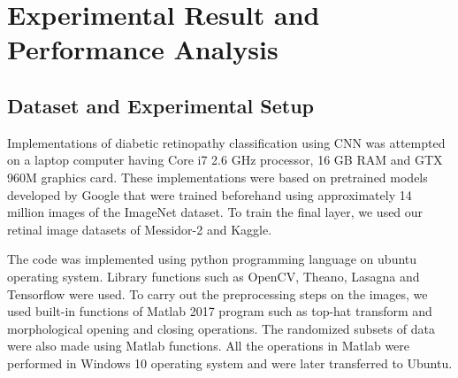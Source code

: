 \documentclass[12pt]{report}
\begin{document}
\chapter{Experimental Result and Performance Analysis}
\section{Dataset and Experimental Setup}
Implementations of diabetic retinopathy classification using CNN was attempted on a laptop computer having Core i7 2.6 GHz processor, 16 GB RAM and GTX 960M graphics card. These implementations were based on pretrained models developed by Google that were trained beforehand using approximately 14 million images of the ImageNet dataset. To train the final layer, we used our retinal image datasets of Messidor-2 and Kaggle. 

\noindent The code was implemented using python programming language on ubuntu operating system. Library functions such as OpenCV, Theano, Lasagna and Tensorflow were used. To carry out the preprocessing steps on the images, we used built-in functions of Matlab 2017 program such as top-hat transform and morphological opening and closing operations. The randomized subsets of data were also made using Matlab functions. All the operations in Matlab were performed in Windows 10 operating system and were later transferred to Ubuntu. 
\end{document}
